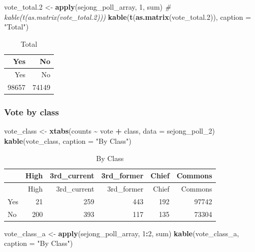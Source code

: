 \documentclass[
]{article}
\newenvironment{Shaded}{\begin{snugshade}}{\end{snugshade}}
\newcommand{\CommentTok}[1]{\textcolor[rgb]{0.56,0.35,0.01}{\textit{#1}}}
\newcommand{\DataTypeTok}[1]{\textcolor[rgb]{0.13,0.29,0.53}{#1}}
\newcommand{\DecValTok}[1]{\textcolor[rgb]{0.00,0.00,0.81}{#1}}
\newcommand{\FloatTok}[1]{\textcolor[rgb]{0.00,0.00,0.81}{#1}}
\newcommand{\KeywordTok}[1]{\textcolor[rgb]{0.13,0.29,0.53}{\textbf{#1}}}
\newcommand{\NormalTok}[1]{#1}
\newcommand{\OperatorTok}[1]{\textcolor[rgb]{0.81,0.36,0.00}{\textbf{#1}}}
\newcommand{\StringTok}[1]{\textcolor[rgb]{0.31,0.60,0.02}{#1}}
\begin{document}
\begin{Shaded}
\begin{Highlighting}[]
\NormalTok{vote\_total}\FloatTok{.2}\NormalTok{ \textless{}{-}}\StringTok{ }\KeywordTok{apply}\NormalTok{(sejong\_poll\_array, }\DecValTok{1}\NormalTok{, sum)}
\CommentTok{\# kable(t(as.matrix(vote\_total.2)))}
\KeywordTok{kable}\NormalTok{(}\KeywordTok{t}\NormalTok{(}\KeywordTok{as.matrix}\NormalTok{(vote\_total}\FloatTok{.2}\NormalTok{)), }
      \DataTypeTok{caption =} \StringTok{"Total"}\NormalTok{)}
\end{Highlighting}
\end{Shaded}

\begin{longtable}[]{@{}rr@{}}
\caption{Total}\tabularnewline
\toprule
Yes & No\tabularnewline
\midrule
\endfirsthead
\toprule
Yes & No\tabularnewline
\midrule
\endhead
98657 & 74149\tabularnewline
\bottomrule
\end{longtable}

\hypertarget{vote-by-class}{%
\subsubsection{Vote by class}\label{vote-by-class}}

\begin{Shaded}
\begin{Highlighting}[]
\NormalTok{vote\_class \textless{}{-}}\StringTok{ }\KeywordTok{xtabs}\NormalTok{(counts }\OperatorTok{\textasciitilde{}}\StringTok{ }\NormalTok{vote }\OperatorTok{+}\StringTok{ }\NormalTok{class, }
                    \DataTypeTok{data =}\NormalTok{ sejong\_poll\_}\DecValTok{2}\NormalTok{)}
\KeywordTok{kable}\NormalTok{(vote\_class, }
      \DataTypeTok{caption =} \StringTok{"By Class"}\NormalTok{)}
\end{Highlighting}
\end{Shaded}

\begin{longtable}[]{@{}lrrrrr@{}}
\caption{By Class}\tabularnewline
\toprule
& High & 3rd\_current & 3rd\_former & Chief & Commons\tabularnewline
\midrule
\endfirsthead
\toprule
& High & 3rd\_current & 3rd\_former & Chief & Commons\tabularnewline
\midrule
\endhead
Yes & 21 & 259 & 443 & 192 & 97742\tabularnewline
No & 200 & 393 & 117 & 135 & 73304\tabularnewline
\bottomrule
\end{longtable}

\begin{Shaded}
\begin{Highlighting}[]
\NormalTok{vote\_class\_a \textless{}{-}}\StringTok{ }\KeywordTok{apply}\NormalTok{(sejong\_poll\_array, }\DecValTok{1}\OperatorTok{:}\DecValTok{2}\NormalTok{, sum)}
\KeywordTok{kable}\NormalTok{(vote\_class\_a, }
      \DataTypeTok{caption =} \StringTok{"By Class"}\NormalTok{)}
\end{Highlighting}
\end{Shaded}
\end{document}
